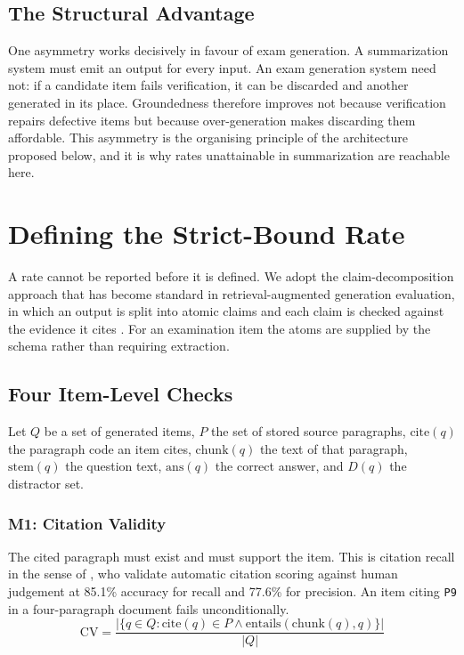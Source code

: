 \documentclass[stu,11pt,floatsintext]{apa7}
\begin{document}
\subsection{The Structural Advantage}

One asymmetry works decisively in favour of exam generation. A summarization
system must emit an output for every input. An exam generation system need not:
if a candidate item fails verification, it can be discarded and another
generated in its place. Groundedness therefore improves not because verification
repairs defective items but because over-generation makes discarding them
affordable. This asymmetry is the organising principle of the architecture
proposed below, and it is why rates unattainable in summarization are reachable
here.

\section{Defining the Strict-Bound Rate}

A rate cannot be reported before it is defined. We adopt the claim-decomposition
approach that has become standard in retrieval-augmented generation evaluation,
in which an output is split into atomic claims and each claim is checked against
the evidence it cites \parencite{es2024ragas}. For an examination item the atoms
are supplied by the schema rather than requiring extraction.

\subsection{Four Item-Level Checks}

Let $Q$ be a set of generated items, $P$ the set of stored source paragraphs,
$\mathrm{cite}(q)$ the paragraph code an item cites, $\mathrm{chunk}(q)$ the text
of that paragraph, $\mathrm{stem}(q)$ the question text, $\mathrm{ans}(q)$ the
correct answer, and $D(q)$ the distractor set.

\subsubsection{M1: Citation Validity} The cited paragraph must exist and must
support the item. This is citation recall in the sense of
\textcite{gao2023enabling}, who validate automatic citation scoring against human
judgement at 85.1\% accuracy for recall and 77.6\% for precision. An item citing
\texttt{P9} in a four-paragraph document fails unconditionally.
\begin{equation}
\mathrm{CV} = \frac{\bigl|\{q \in Q : \mathrm{cite}(q) \in P \wedge \mathrm{entails}(\mathrm{chunk}(q), q)\}\bigr|}{|Q|}
\end{equation}
\end{document}
